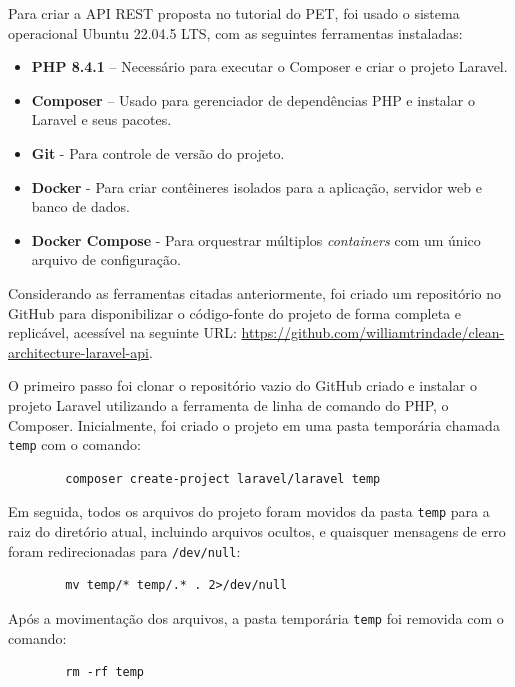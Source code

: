         \par Para criar a API REST proposta no tutorial do PET, foi usado o sistema operacional Ubuntu 22.04.5 LTS, com as seguintes ferramentas instaladas:

        \begin{itemize}
            \item \textbf{PHP 8.4.1} – Necessário para executar o Composer e criar o projeto Laravel.
            \item \textbf{Composer} – Usado para gerenciador de dependências PHP e instalar o Laravel e seus pacotes.
            \item \textbf{Git} - Para controle de versão do projeto.
            \item \textbf{Docker} - Para criar contêineres isolados para a aplicação, servidor web e banco de dados.
            \item \textbf{Docker Compose} - Para orquestrar múltiplos \textit{containers} com um único arquivo de configuração.
        \end{itemize}

        \par Considerando as ferramentas citadas anteriormente, foi criado um repositório no GitHub para disponibilizar o código-fonte do projeto de forma completa e replicável, acessível na seguinte URL: \url{https://github.com/williamtrindade/clean-architecture-laravel-api}.

        \par O primeiro passo foi clonar o repositório vazio do GitHub criado e instalar o projeto Laravel utilizando a ferramenta de linha de comando do PHP, o Composer. Inicialmente, foi criado o projeto em uma pasta temporária chamada \texttt{temp} com o comando:
        \begin{verbatim}
        composer create-project laravel/laravel temp
        \end{verbatim}
    
        \par Em seguida, todos os arquivos do projeto foram movidos da pasta \texttt{temp} para a raiz do diretório atual, incluindo arquivos ocultos, e quaisquer mensagens de erro foram redirecionadas para \texttt{/dev/null}:
        \begin{verbatim}
        mv temp/* temp/.* . 2>/dev/null
        \end{verbatim}
        Após a movimentação dos arquivos, a pasta temporária \texttt{temp} foi removida com o comando:
        \begin{verbatim}
        rm -rf temp
        \end{verbatim}

